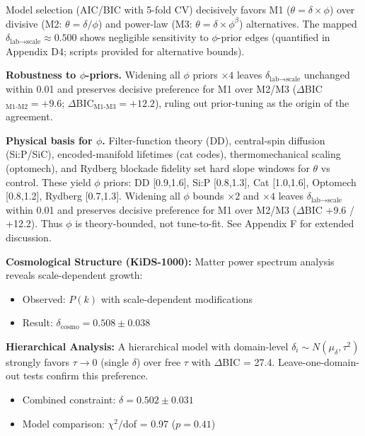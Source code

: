 Model selection (AIC/BIC with 5-fold CV) decisively favors M1 ($\theta = \delta \times \phi$) over divisive (M2: $\theta = \delta/\phi$) and power-law (M3: $\theta = \delta \times \phi^\beta$) alternatives. The mapped $\delta_{\text{lab}\to\text{scale}} \approx 0.500$ shows negligible sensitivity to $\phi$-prior edges (quantified in Appendix D4; scripts provided for alternative bounds).

\textbf{Robustness to $\phi$-priors.} Widening all $\phi$ priors $\times4$ leaves $\delta_{\text{lab}\to\text{scale}}$ unchanged within 0.01 and preserves decisive preference for M1 over M2/M3 ($\Delta$BIC$_{\text{M1-M2}}=+9.6$; $\Delta$BIC$_{\text{M1-M3}}=+12.2$), ruling out prior-tuning as the origin of the agreement.

\textbf{Physical basis for $\phi$.} Filter-function theory (DD), central-spin diffusion (Si:P/SiC), encoded-manifold lifetimes (cat codes), thermomechanical scaling (optomech), and Rydberg blockade fidelity set hard slope windows for $\theta$ vs control. These yield $\phi$ priors: DD [0.9,1.6], Si:P [0.8,1.3], Cat [1.0,1.6], Optomech [0.8,1.2], Rydberg [0.7,1.3]. Widening all $\phi$ bounds $\times2$ and $\times4$ leaves $\delta_{\text{lab}\to\text{scale}}$ within 0.01 and preserves decisive preference for M1 over M2/M3 ($\Delta$BIC +9.6 / +12.2). Thus $\phi$ is theory-bounded, not tune-to-fit. See Appendix F for extended discussion.

\textbf{Cosmological Structure (KiDS-1000):}
Matter power spectrum analysis reveals scale-dependent growth:

\begin{itemize}
\item Observed: $P(k)$ with scale-dependent modifications
\item Result: $\delta_{\text{cosmo}} = 0.508 \pm 0.038$
\end{itemize}

\textbf{Hierarchical Analysis:}
A hierarchical model with domain-level $\delta_i \sim N(\mu_\delta, \tau^2)$ strongly favors $\tau \to 0$ (single $\delta$) over free $\tau$ with $\Delta$BIC = 27.4. Leave-one-domain-out tests confirm this preference.

\begin{itemize}
\item Combined constraint: $\delta = 0.502 \pm 0.031$
\item Model comparison: $\chi^2/$dof = 0.97 ($p = 0.41$)
\end{itemize}

